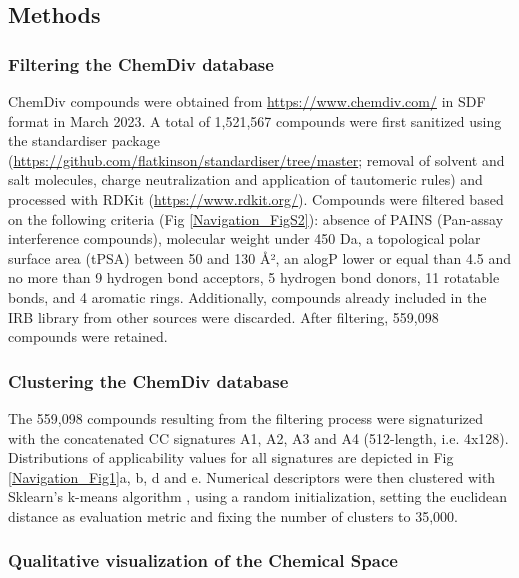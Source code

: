 \subsection{Methods}
\label{Navigation_Methods}



\subsubsection{Filtering the ChemDiv database}

ChemDiv compounds were obtained from \hyperlink{https://www.chemdiv.com/}{https://www.chemdiv.com/} in SDF format in March 2023. A total of 1,521,567 compounds were first sanitized using the standardiser package (\hyperlink{https://github.com/flatkinson/standardiser/tree/master}{https://github.com/flatkinson/standardiser/tree/master}; removal of solvent and salt molecules, charge neutralization and application of tautomeric rules) and processed with RDKit (\hyperlink{https://www.rdkit.org/}{https://www.rdkit.org/}). Compounds were filtered based on the following criteria (Fig \ref{Navigation_FigS2}): absence of PAINS\cite{baell_chemistry_2014} (Pan-assay interference compounds), molecular weight under 450 Da, a topological polar surface area (tPSA) between 50 and 130 Å², an alogP lower or equal than 4.5 and no more than 9 hydrogen bond acceptors, 5 hydrogen bond donors, 11 rotatable bonds, and 4 aromatic rings. Additionally, compounds already included in the IRB library from other sources were discarded. After filtering, 559,098 compounds were retained.


\subsubsection{Clustering the ChemDiv database}

The 559,098 compounds resulting from the filtering process were signaturized with the concatenated CC signatures A1, A2, A3 and A4 (512-length, i.e. 4x128). Distributions of applicability values for all signatures are depicted in Fig \ref{Navigation_Fig1}a, b, d and e. Numerical descriptors were then clustered with Sklearn’s k-means algorithm \cite{pedregosa_scikit-learn_2011}, using a random initialization, setting the euclidean distance as evaluation metric and fixing the number of clusters to 35,000. 

\subsubsection{Qualitative visualization of the Chemical Space}

